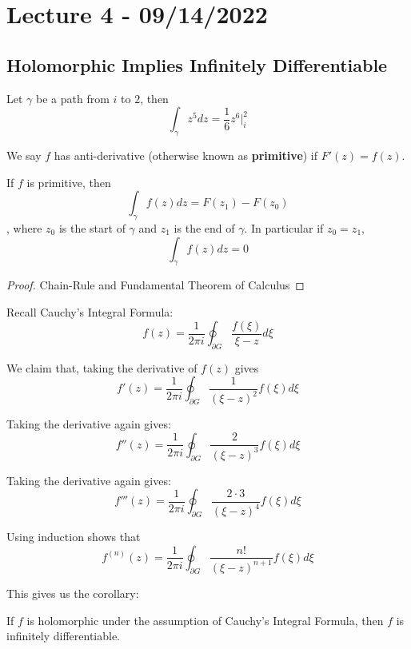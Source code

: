 \section{Lecture 4 - 09/14/2022}

\subsection{Holomorphic Implies Infinitely Differentiable}

\begin{example}
Let $\gamma$ be a path from $i$ to $2$, then
\[\int_\gamma z^5 dz = \frac{1}{6} z^6 |_i^2\]
\end{example}

\begin{definition}
We say $f$ has anti-derivative (otherwise known as \textbf{primitive}) if $F'(z) = f(z)$.
\end{definition}

\begin{proposition}
    If $f$ is primitive, then
    \[\int_\gamma f(z) dz = F(z_1) - F(z_0)\]
    , where $z_0$ is the start of $\gamma$ and $z_1$ is the end of $\gamma$. In particular if $z_0 = z_1$,
    \[\int_\gamma f(z) dz = 0\]
\end{proposition}

\begin{proof}
Chain-Rule and Fundamental Theorem of Calculus
\end{proof}

Recall Cauchy's Integral Formula:
\[f(z) = \frac{1}{2\pi i} \oint_{\partial G} \frac{f(\xi)}{\xi - z} d\xi\]

We claim that, taking the derivative of $f(z)$ gives
\[f'(z) = \frac{1}{2\pi i}  \oint_{\partial G} \frac{1}{(\xi - z)^2} f(\xi) d\xi\]

Taking the derivative again gives:
\[f''(z) = \frac{1}{2\pi i}  \oint_{\partial G} \frac{2}{(\xi - z)^3} f(\xi) d\xi\]

Taking the derivative again gives:
\[f'''(z) = \frac{1}{2\pi i}  \oint_{\partial G} \frac{2 \cdot 3}{(\xi - z)^4} f(\xi) d\xi\]

Using induction shows that
\[f^{(n)}(z) = \frac{1}{2 \pi i} \oint_{\partial G} \frac{n!}{(\xi - z)^{n+1}} f(\xi) d\xi\]

This gives us the corollary:

\begin{corollary}
    If $f$ is holomorphic under the assumption of Cauchy's Integral Formula, then $f$ is infinitely differentiable.
\end{corollary}

